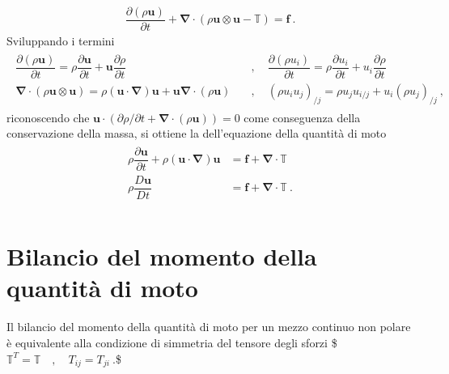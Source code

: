 \documentclass[letterpaper,10pt,italian]{jupyterBook}
\begin{document}
\begin{equation*}
\begin{split}\dfrac{\partial(\rho \mathbf{u})}{\partial t}  + \mathbf{\nabla} \cdot ( \rho \mathbf{u} \otimes \mathbf{u} - \mathbb{T} ) = \mathbf{f} \ .\end{split}
\end{equation*}
\sphinxAtStartPar
Sviluppando i termini
\begin{equation*}
\begin{split}\begin{aligned}
 \dfrac{\partial (\rho \mathbf{u})}{\partial t} = \rho \dfrac{\partial \mathbf{u}}{\partial t} + \mathbf{u} \dfrac{\partial \rho}{\partial t} \quad & , \quad 
 \dfrac{\partial (\rho u_i)}{\partial t} = \rho \dfrac{\partial u_i}{\partial t} + u_i \dfrac{\partial \rho}{\partial t} \\
 \mathbf{\nabla} \cdot ( \rho \mathbf{u} \otimes \mathbf{u} ) = \rho (\mathbf{u} \cdot \mathbf{\nabla}) \mathbf{u} + \mathbf{u} \mathbf{\nabla} \cdot (\rho \mathbf{u}) \quad & , \quad 
 ( \rho u_i u_j )_{/j} = \rho u_j u_{i/j} + u_i (\rho u_j)_{/j} 
  \ ,
\end{aligned}\end{split}
\end{equation*}
\sphinxAtStartPar
riconoscendo che
\(\mathbf{u} \cdot (\partial \rho/\partial t + \mathbf{\nabla} \cdot (\rho \mathbf{u}))=0\)
come conseguenza della conservazione della massa, si ottiene la  dell’equazione della quantità di moto
\begin{equation*}
\begin{split}\begin{aligned}
   \rho \dfrac{\partial\mathbf{u}}{\partial t}  +  \rho (\mathbf{u}  \cdot \mathbf{\nabla} ) \mathbf{u}& = \mathbf{f} + \mathbf{\nabla} \cdot \mathbb{T}  \\ 
   \rho \dfrac{D \mathbf{u}}{D t} & = \mathbf{f} + \mathbf{\nabla} \cdot \mathbb{T} \ . \\ 
  \end{aligned}\end{split}
\end{equation*}

\section{Bilancio del momento della quantità di moto}
\label{\detokenize{polimi/fluidmechanics-ita/template/capitoli/04_bilanci/04teoria:bilancio-del-momento-della-quantita-di-moto}}
\sphinxAtStartPar
Il bilancio del momento della quantità di moto per un mezzo continuo non
polare è equivalente alla condizione di simmetria del tensore degli
sforzi \$\(\mathbb{T}^T = \mathbb{T} \quad , \quad T_{ij} = T_{ji} \ .\)\$
\end{document}
